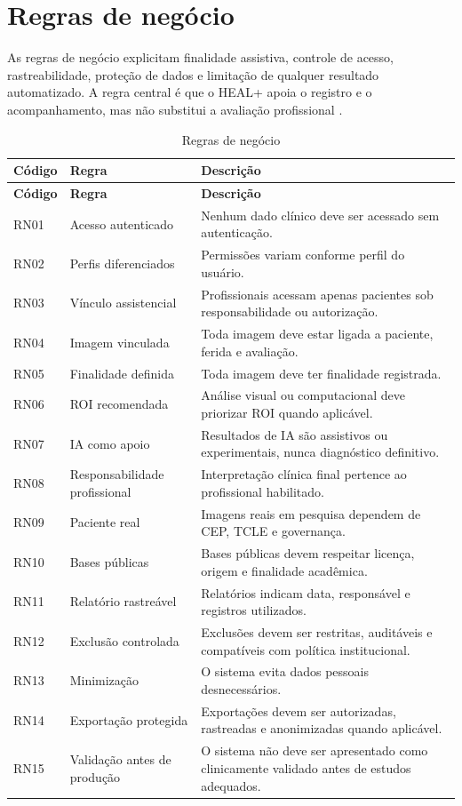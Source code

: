 \documentclass[
    12pt,
    oneside,
    a4paper,
    chapter=TITLE,
    brazil,
    sumario=tradicional,
    hidelinks
]{abntex2}
\begin{document}
\chapter{Regras de negócio}

As regras de negócio explicitam finalidade assistiva, controle de acesso, rastreabilidade, proteção de dados e limitação de qualquer resultado automatizado. A regra central é que o HEAL+ apoia o registro e o acompanhamento, mas não substitui a avaliação profissional \cite{who2021,who2023}.

\begin{longtable}{L{1.6cm}L{4.0cm}L{7.6cm}}
\caption{\label{tab:regras-negocio}Regras de negócio}\\
\toprule
\textbf{Código} & \textbf{Regra} & \textbf{Descrição} \\
\midrule
\endfirsthead
\toprule
\textbf{Código} & \textbf{Regra} & \textbf{Descrição} \\
\midrule
\endhead
RN01 & Acesso autenticado & Nenhum dado clínico deve ser acessado sem autenticação. \\
RN02 & Perfis diferenciados & Permissões variam conforme perfil do usuário. \\
RN03 & Vínculo assistencial & Profissionais acessam apenas pacientes sob responsabilidade ou autorização. \\
RN04 & Imagem vinculada & Toda imagem deve estar ligada a paciente, ferida e avaliação. \\
RN05 & Finalidade definida & Toda imagem deve ter finalidade registrada. \\
RN06 & ROI recomendada & Análise visual ou computacional deve priorizar ROI quando aplicável. \\
RN07 & IA como apoio & Resultados de IA são assistivos ou experimentais, nunca diagnóstico definitivo. \\
RN08 & Responsabilidade profissional & Interpretação clínica final pertence ao profissional habilitado. \\
RN09 & Paciente real & Imagens reais em pesquisa dependem de CEP, TCLE e governança. \\
RN10 & Bases públicas & Bases públicas devem respeitar licença, origem e finalidade acadêmica. \\
RN11 & Relatório rastreável & Relatórios indicam data, responsável e registros utilizados. \\
RN12 & Exclusão controlada & Exclusões devem ser restritas, auditáveis e compatíveis com política institucional. \\
RN13 & Minimização & O sistema evita dados pessoais desnecessários. \\
RN14 & Exportação protegida & Exportações devem ser autorizadas, rastreadas e anonimizadas quando aplicável. \\
RN15 & Validação antes de produção & O sistema não deve ser apresentado como clinicamente validado antes de estudos adequados. \\
\bottomrule
\end{longtable}
\end{document}
